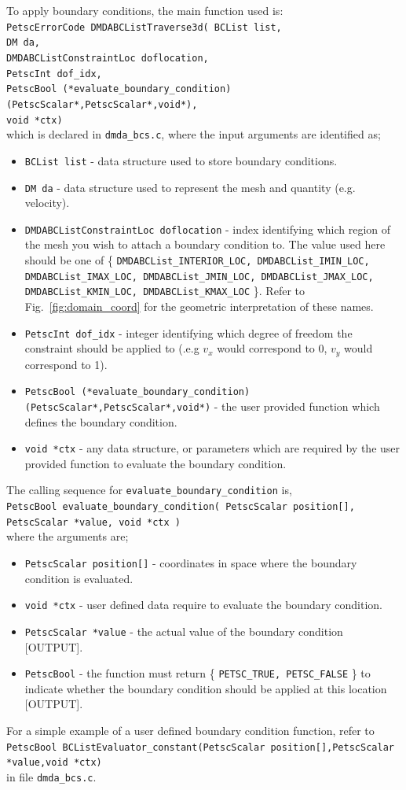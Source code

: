 \documentclass[paper=a4, fontsize=11pt,twoside]{scrartcl}
\newcommand{\shellcmd}[1]{\\\indent\indent\texttt{\hspace{5mm}\footnotesize #1}\\}
\newcommand{\unix}[1]{\texttt{\footnotesize #1}}
\begin{document}
{{To apply boundary conditions, the main function used is:
\shellcmd{PetscErrorCode DMDABCListTraverse3d( \newline
 BCList list, \\
  DM da, \\
  DMDABCListConstraintLoc doflocation, \\
  PetscInt dof\_idx, \\
  PetscBool (*evaluate\_boundary\_condition)(PetscScalar*,PetscScalar*,void*), \\
  void *ctx)} 
which is declared in \unix{dmda\_bcs.c}, where the input arguments are identified as;
\begin{itemize}
\item[] \unix{BCList list} - data structure used to store boundary conditions.
\item[] \unix{DM da} - data structure used to represent the mesh and quantity (e.g. velocity).
\item[] \unix{DMDABCListConstraintLoc doflocation} - index identifying which region of the mesh you wish to attach a boundary condition to. The value used here should be one of 
	\{ \unix{DMDABCList\_INTERIOR\_LOC, 
	DMDABCList\_IMIN\_LOC,
	DMDABCList\_IMAX\_LOC,
	DMDABCList\_JMIN\_LOC,
	DMDABCList\_JMAX\_LOC,
	DMDABCList\_KMIN\_LOC,
	DMDABCList\_KMAX\_LOC} \}.
Refer to Fig.~\ref{fig:domain_coord} for the geometric interpretation of these names.
\item[] \unix{PetscInt dof\_idx} - integer identifying which degree of freedom the constraint should be applied to (.e.g $v_x$ would correspond to 0, $v_y$ would correspond to 1).
\item[] \unix{PetscBool (*evaluate\_boundary\_condition)(PetscScalar*,PetscScalar*,void*)} - the user provided function which defines the boundary condition.
\item[] \unix{void *ctx} - any data structure, or parameters which are required by the user provided function to evaluate the boundary condition.
\end{itemize}

The calling sequence for \unix{evaluate\_boundary\_condition} is,
\shellcmd{PetscBool evaluate\_boundary\_condition( PetscScalar position[], PetscScalar *value, void *ctx )}
where the arguments are;
\begin{itemize}
\item[] \unix{PetscScalar position[]} - coordinates in space where the boundary condition is evaluated.
\item[] \unix{void *ctx} - user defined data require to evaluate the boundary condition.
\item[] \unix{PetscScalar *value} - the actual value of the boundary condition [OUTPUT].
\item[] \unix{PetscBool} - the function must return \{ \unix{PETSC\_TRUE, PETSC\_FALSE} \} to indicate whether the boundary condition should be applied at this location [OUTPUT].
\end{itemize}
For a simple example of a user defined boundary condition function, refer to 
\shellcmd{PetscBool BCListEvaluator\_constant(PetscScalar position[],PetscScalar *value,void *ctx)}
in file \unix{dmda\_bcs.c}.

}}
\end{document}
